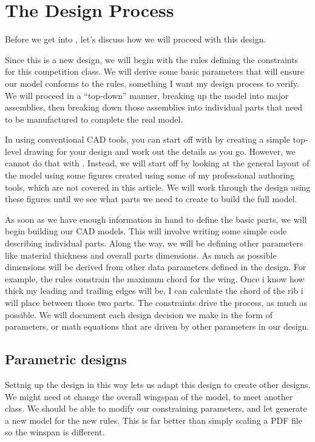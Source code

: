 \section{The Design Process}

Before we get into \osc, let's discuss how we will proceed with this design.

Since this is a new design, we will begin with the rules defining the
constraints for this competition class. We will derive some basic parameters
that will ensure our model conforms to the rules, something I want my design process
to verify. We will proceed in a ``top-down'' manner, breaking up the model into
major assemblies, then breaking down those assemblies into individual parts
that need to be manufactured to complete the real model.

In using conventional CAD tools, you can start off with by creating a simple
top-level drawing for your design and work out the details as you go. However,
we cannot do that with \osc. Instead, we will start off by looking at the
general layout of the model using some figures created using some of my
professional authoring tools, which are not covered in this article. We will work through the design using these figures until we see what parts we need to create to build the full model.

As soon as we have enough information in hand to define the basic parts, we will begin building our CAD models. This will involve writing some simple code describing individual parts. Along the way, we will be
defining other parameters like material thickness and overall parts dimensions.
As much as possible dimensions will be derived from other data parameters
defined in the design. For example, the rules constrain the maximum chord for the wing. Once i know how thick my leading and trailing edges will be, I can calculate the chord of the rib i will place between those two parts. The constraints drive the process, as much as possible. We will document each design decision we make in the form of parameters, or math equations that are driven by other parameters in our design.

\subsection{Parametric designs}

Settnig up the design in this way lets us adapt this design to create other designs. We might need ot change the overall wingspan of the model, to meet another class. We should be able to modify our constraining parameters, and let \osc generate a new model for the new rules. This is far better than simply scaling a PDF file so the winspan is different.

